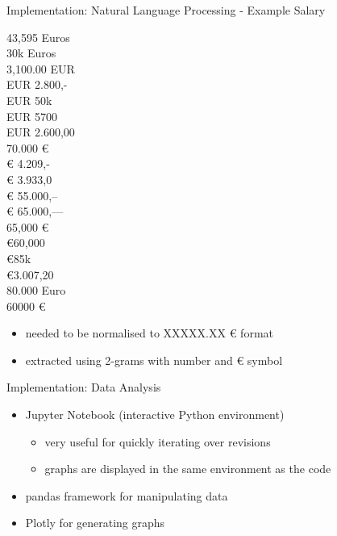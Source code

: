 \documentclass[aspectratio=169]{beamer}
\begin{document}
  \begin{frame}{Implementation: Natural Language Processing - Example Salary}
    \begin{multicols}{3}
      43,595 Euros \\
      30k Euros \\
      3,100.00 EUR \\
      EUR 2.800,- \\
      EUR 50k \\
      EUR 5700 \\
      EUR 2.600,00 \\
      70.000 € \\
      € 4.209,- \\
      € 3.933,0 \\
      € 55.000,-- \\
      € 65.000,--- \\
      65,000 € \\
      €60,000 \\
      €85k \\
      €3.007,20 \\
      80.000 Euro \\
      60000 €
    \end{multicols}

    \begin{itemize}
      \item needed to be normalised to XXXXX.XX € format
      \item extracted using 2-grams with number and € symbol
    \end{itemize}
  \end{frame}

  \begin{frame}{Implementation: Data Analysis}
    \begin{itemize}
      \item Jupyter Notebook (interactive Python environment)
        \begin{itemize}
          \item very useful for quickly iterating over revisions
          \item graphs are displayed in the same environment as the code
        \end{itemize}
      \item pandas framework for manipulating data
      \item Plotly for generating graphs
    \end{itemize}
  \end{frame}
\end{document}
